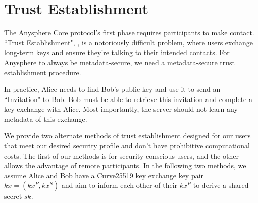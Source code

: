 \newpage
\section{Trust Establishment}
\label{sec:trustestablishment}

The Anysphere Core protocol's first phase requires participants to make contact. ``Trust Establishment", \cite{unger2015sok}, is a notoriously difficult problem, where users exchange long-term keys and ensure they're talking to their intended contacts. For Anysphere to always be metadata-secure, we need a metadata-secure trust establishment procedure.

In practice, Alice needs to find Bob's public key and use it to send an ``Invitation" to Bob. Bob must be able to retrieve this invitation and complete a key exchange with Alice. Most importantly, the server should not learn any metadata of this exchange. 

We provide two alternate methods of trust establishment designed for our users that meet our desired security profile and don't have prohibitive computational costs. The first of our methods is for security-conscious users, and the other allows the advantage of remote participants. In the following two methods, we assume Alice and Bob have a Curve25519 key exchange key pair $kx = (kx^P, kx^S)$ and aim to inform each other of their $kx^P$ to derive a shared secret $sk$. 






